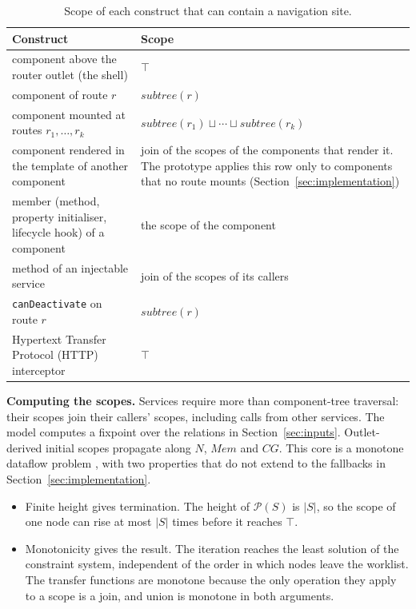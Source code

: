 \begin{table}[t]\small
\caption{Scope of each construct that can contain a navigation site.}
\label{tab:scopes}
\begin{tabularx}{\textwidth}{@{}YY@{}}
\toprule
Construct & Scope \\
\midrule
component above the router outlet (the shell) & $\top$ \\
component of route $r$ & $\mathit{subtree}(r)$ \\
component mounted at routes $r_1, \ldots, r_k$ &
$\mathit{subtree}(r_1) \sqcup \cdots \sqcup \mathit{subtree}(r_k)$ \\
component rendered in the template of another component & join of the scopes of the
components that render it. The prototype applies this row only to components that no
route mounts (Section~\ref{sec:implementation}) \\
member (method, property initialiser, lifecycle hook) of a component & the scope of the
component \\
method of an injectable service & join of the scopes of its callers \\
\texttt{canDeactivate} on route $r$ & $\mathit{subtree}(r)$ \\
Hypertext Transfer Protocol (HTTP) interceptor & $\top$ \\
\bottomrule
\end{tabularx}
\end{table}

\textbf{Computing the scopes.} Services require more than component-tree traversal: their
scopes join their callers' scopes, including calls from other services. The model computes a fixpoint over the relations in Section~\ref{sec:inputs}. Outlet-derived initial scopes
propagate along $N$, $\mathit{Mem}$ and $\mathit{CG}$. This core is a monotone dataflow
problem \cite{kildall1973unified,nielson1999principles}, with two properties that do not
extend to the fallbacks in Section~\ref{sec:implementation}.
\begin{itemize}
\item Finite height gives termination. The height of $\mathcal{P}(S)$ is $|S|$, so the scope of
one node can rise at most $|S|$ times before it reaches $\top$.
\item Monotonicity gives the result. The iteration reaches the least solution of the constraint
system, independent of the order in which nodes leave the worklist. The transfer functions are
monotone because the only operation they apply to a scope is a join, and union is monotone in
both arguments.
\end{itemize}

